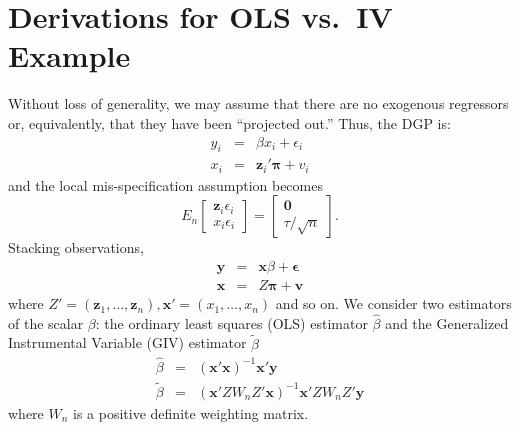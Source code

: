 \documentclass[12pt]{article}\usepackage[]{graphicx}\usepackage[]{color}
\theoremstyle{definition}
\begin{document}
\section{Derivations for OLS vs.\ IV Example}
Without loss of generality, we may assume that there are no exogenous regressors or, equivalently, that they have been ``projected out.'' Thus, the DGP is: 
    	\begin{eqnarray}
			y_{i} &=& \beta x_{i}  + \epsilon_{i}\\
	x_{i} &=& \mathbf{z}_{i}' \boldsymbol{\pi} + v_{i}
		\end{eqnarray}
and the local mis-specification assumption becomes
  \begin{equation}
    E_n \left[\begin{array}{c} \mathbf{z}_i \epsilon_i \\ x_i \epsilon_i \end{array}\right] = \left[\begin{array}{c} \mathbf{0} \\ \tau/\sqrt{n} \end{array}\right].
  \end{equation}
Stacking observations,
\begin{eqnarray}
    \mathbf{y} &=& \mathbf{x}\beta + \boldsymbol{\epsilon}\\
    \mathbf{x} &=& Z\boldsymbol{\pi} + \mathbf{v}
\end{eqnarray}
where $Z' = (\mathbf{z}_{1}, \hdots, \mathbf{z}_{n}), \mathbf{x}' = (x_{1}, \hdots, x_{n})$ and so on. We consider two estimators of the scalar $\beta$: the ordinary least squares (OLS) estimator $\widehat{\beta}$ and the Generalized Instrumental Variable (GIV) estimator $\widetilde{\beta}$
  \begin{eqnarray}
		\widehat{\beta} &=& \left(\mathbf{x}'\mathbf{x}\right)^{-1}\mathbf{x}'\mathbf{y}\\
		\widetilde{\beta} &=& \left(\mathbf{x}'Z W_n Z'\mathbf{x}\right)^{-1}\mathbf{x}'Z W_nZ'\mathbf{y}
	\end{eqnarray}
where $W_n$ is a positive definite weighting matrix. 
\end{document}

